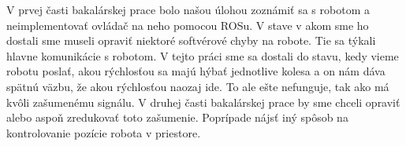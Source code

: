 V prvej časti bakalárskej prace bolo našou úlohou zoznámiť sa s robotom a neimplementovať ovládač na neho pomocou ROSu.
V stave v akom sme ho dostali sme museli opraviť niektoré softvérové chyby na robote. Tie sa týkali hlavne komunikácie s robotom.
V tejto práci sme sa dostali do stavu, kedy vieme robotu poslať, akou rýchlosťou sa majú hýbať jednotlive kolesa a on nám dáva spätnú väzbu,
že akou rýchlosťou naozaj ide. To ale ešte nefunguje, tak ako má kvôli zašumenému signálu. V druhej časti bakalárskej prace by sme chceli opraviť
alebo aspoň zredukovať toto zašumenie. Poprípade nájsť iný spôsob na kontrolovanie pozície robota v priestore.

